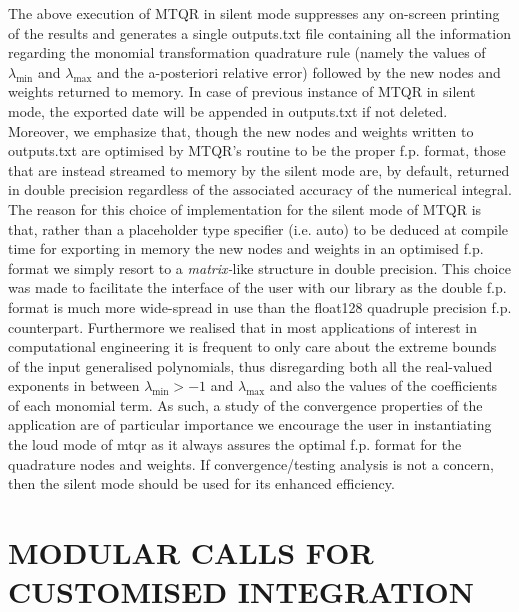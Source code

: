 \documentclass[a4paper, twosided]{book}
\begin{document}
\noindent
The above execution of MTQR in silent mode suppresses any on-screen printing of the results and generates a single \colorbox{poliGrayBlue}{outputs.txt} file containing all the information regarding the monomial transformation quadrature rule (namely the values of $\lambda_{\text{min}}$ and $\lambda_{\text{max}}$ and the a-posteriori relative error) followed by the new nodes and weights returned to memory. In case of previous instance of MTQR in silent mode, the exported date will be appended in  \colorbox{poliGrayBlue}{outputs.txt} if not deleted. Moreover, we emphasize that, though the new nodes and weights written to \colorbox{poliGrayBlue}{outputs.txt} are optimised by MTQR's routine to be the proper f.p. format, those that are instead streamed to memory by the silent mode are, by default, returned in \colorbox{poliGrayBlue}{double} precision regardless of the associated accuracy of the numerical integral. The reason for this choice of implementation for the silent mode of MTQR is that, rather than a placeholder type specifier (i.e. \colorbox{poliGrayBlue}{auto}) to be deduced at compile time for exporting in memory the new nodes and weights in an optimised f.p. format we simply resort to a {\itshape matrix-}like structure in \colorbox{poliGrayBlue}{double} precision. This choice was made to facilitate the interface of the user with our library as the \colorbox{poliGrayBlue}{double} f.p. format is much more wide-spread in use than the \colorbox{poliGrayBlue}{float128} quadruple precision f.p. counterpart. Furthermore we realised that in most applications of interest in computational engineering it is frequent to only care about the extreme bounds of the input generalised polynomials, thus disregarding both all the real-valued exponents in between $\lambda_{\text{min}}>-1$ and $\lambda_{\text{max}}$ and also the values of the coefficients of each monomial term. As such, a study of the convergence properties of the application are of particular importance we encourage the user in instantiating the loud mode of \colorbox{poliGrayBlue}{mtqr} as it always assures the optimal f.p. format for the quadrature nodes and weights. If convergence/testing analysis is not a concern, then the silent mode should be used for its enhanced efficiency.

\section[Modular calls for customised integration]{\changefont MODULAR CALLS FOR CUSTOMISED INTEGRATION}\label{Sec3.4}
\end{document}
